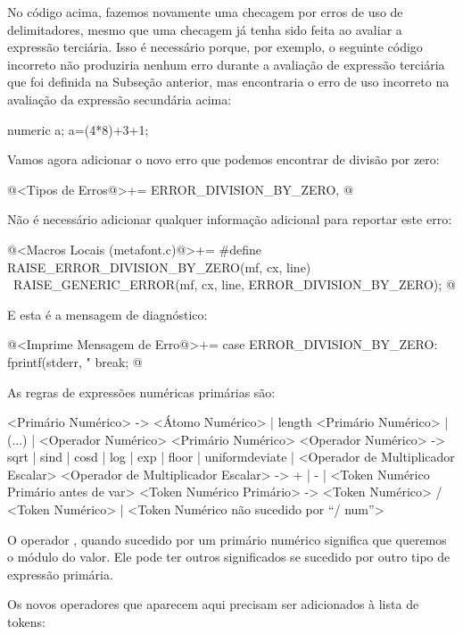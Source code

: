 No código acima, fazemos novamente uma checagem por erros de uso de
delimitadores, mesmo que uma checagem já tenha sido feita ao avaliar a
expressão terciária. Isso é necessário porque, por exemplo, o seguinte
código incorreto não produziria nenhum erro durante a avaliação de
expressão terciária que foi definida na Subseção anterior, mas
encontraria o erro de uso incorreto na avaliação da expressão
secundária acima:

\alinhaverbatim
numeric a;
a=(4*{8)+3}+1;
\alinhanormal

Vamos agora adicionar o novo erro que podemos encontrar de divisão por
zero:

\iniciocodigo
@<Tipos de Erros@>+=
ERROR_DIVISION_BY_ZERO,
@
\fimcodigo

Não é necessário adicionar qualquer informação adicional para reportar
este erro:

\iniciocodigo
@<Macros Locais (metafont.c)@>+=
#define RAISE_ERROR_DIVISION_BY_ZERO(mf, cx, line) {\
    RAISE_GENERIC_ERROR(mf, cx, line, ERROR_DIVISION_BY_ZERO);}
@
\fimcodigo

E esta é a mensagem de diagnóstico:

\iniciocodigo
@<Imprime Mensagem de Erro@>+=
case ERROR_DIVISION_BY_ZERO:
  fprintf(stderr, "%
  break;
@
\fimcodigo



As regras de expressões numéricas primárias são:

\alinhaverbatim
<Primário Numérico> -> <Átomo Numérico> |
                       length <Primário Numérico> | (...) |
                       <Operador Numérico> <Primário Numérico>
<Operador Numérico> -> sqrt | sind | cosd | log | exp | floor |
                       uniformdeviate |
                       <Operador de Multiplicador Escalar>
<Operador de Multiplicador  Escalar> -> + | - |
                       <Token Numérico Primário antes de var>
<Token Numérico Primário> -> <Token Numérico> / <Token Numérico> |
                             <Token Numérico não sucedido por ``/ num''>
\alinhanormal

O operador , quando sucedido por um primário
numérico significa que queremos o módulo do valor. Ele pode ter outros
significados se sucedido por outro tipo de expressão primária.

Os novos operadores que aparecem aqui precisam ser adicionados à lista
de tokens:

